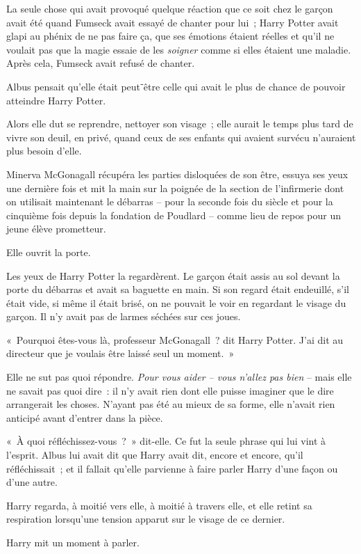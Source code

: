 La seule chose qui avait provoqué quelque réaction que ce soit chez le garçon avait été quand Fumseck avait essayé de chanter pour lui~; Harry Potter avait glapi au phénix de ne pas faire ça, que ses émotions étaient réelles et qu'il ne voulait pas que la magie essaie de les \emph{soigner} comme si elles étaient une maladie.
Après cela, Fumseck avait refusé de chanter.

Albus pensait qu'elle était peut⁻être celle qui avait le plus de chance de pouvoir atteindre Harry Potter.

Alors elle dut se reprendre, nettoyer son visage~; elle aurait le temps plus tard de vivre son deuil, en privé, quand ceux de ses enfants qui avaient survécu n'auraient plus besoin d'elle.

Minerva McGonagall récupéra les parties disloquées de son être, essuya ses yeux une dernière fois et mit la main sur la poignée de la section de l'infirmerie dont on utilisait maintenant le débarras -- pour la seconde fois du siècle et pour la cinquième fois depuis la fondation de Poudlard -- comme lieu de repos pour un jeune élève prometteur.

Elle ouvrit la porte.

Les yeux de Harry Potter la regardèrent.
Le garçon était assis au sol devant la porte du débarras et avait sa baguette en main.
Si son regard était endeuillé, s'il était vide, si même il était brisé, on ne pouvait le voir en regardant le visage du garçon.
Il n'y avait pas de larmes séchées sur ces joues.

«~Pourquoi êtes-vous là, professeur McGonagall~? dit Harry Potter.
J'ai dit au directeur que je voulais être laissé seul un moment.~»

Elle ne sut pas quoi répondre.
\emph{Pour vous aider -- vous n'allez pas bien} -- mais elle ne savait pas quoi dire~: il n'y avait rien dont elle puisse imaginer que le dire arrangerait les choses.
N'ayant pas été au mieux de sa forme, elle n'avait rien anticipé avant d'entrer dans la pièce.

«~À quoi réfléchissez-vous~?~»
dit-elle.
Ce fut la seule phrase qui lui vint à l'esprit.
Albus lui avait dit que Harry avait dit, encore et encore, qu'il réfléchissait~; et il fallait qu'elle parvienne à faire parler Harry d'une façon ou d'une autre.

Harry regarda, à moitié vers elle, à moitié à travers elle, et elle retint sa respiration lorsqu'une tension apparut sur le visage de ce dernier.

Harry mit un moment à parler.


